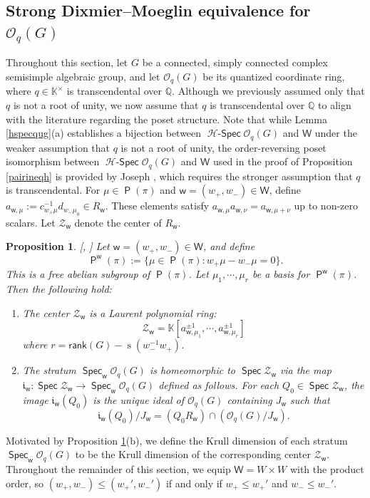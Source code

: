 \documentclass[11pt]{article}
\newtheorem{prop}[equation]{Proposition}
\theoremstyle{definition}
\numberwithin{equation}{section}
\newcommand{\QQ}{\mathbb{Q}}
\newcommand{\KK}{\mathbb{K}}
\newcommand{\qu}{\mathcal{O}}
\newcommand{\cZ}{\mathcal{Z}}
\newcommand{\Hf}{\mathcal{H}} %
\newcommand\rank{\mathsf{rank}}
\DeclareMathOperator{\si}{\mathrm{s}}
\DeclareMathOperator{\pois}{\mathsf{P}}
\newcommand\ii{\mathfrak{i}}
\newcommand\W{\mathsf{W}}
\newcommand\w{\mathsf{w}}
\DeclareMathOperator{\spec}{\mathsf{Spec}}
\DeclareMathOperator{\hspec}{\Hf-\mathsf{Spec}}
\begin{document}
	\subsection{Strong Dixmier--Moeglin equivalence for $\qu_q(G)$}\label{spdmeOqG}
 Throughout this section, let $G$ be a connected, simply connected complex semisimple algebraic group, and let $\qu_q(G)$ be its quantized coordinate ring, where $q \in \KK^{\times}$ is transcendental over $\QQ$. Although we previously assumed only that $q$ is not a root of unity, we now assume that $q$ is transcendental over $\QQ$ to align with the literature regarding the poset structure. Note that while Lemma \ref{hspecqug}(a) establishes a bijection between $\hspec\qu_q(G)$ and $\W$ under the weaker assumption that $q$ is not a root of unity, the order-reversing poset isomorphism between $\hspec\qu_q(G)$ and $\W$ used in the proof of Proposition \ref{pairineqh} is provided by Joseph \cite{JO95}, which requires the stronger assumption that $q$ is transcendental.  For $\mu\in\pois(\pi)$ and $\w= (w_+,w_-)\in\W$, define $a_{\w,\mu}:= c_{w_+\mu}^{-1}d_{w_-\mu_0}\in R_{\w}$. These elements satisfy $a_{\w,\mu}a_{\w,\nu}= a_{\w,\mu+ \nu}$ up to non-zero scalars. Let $\cZ_{\w}$ denote the center of $R_{\w}$. 


 \begin{prop}\label{centstrat}[\cite[Theorem II.4.14]{BG02}, \cite[Theorems 3.1 and 2.3(ii)]{YA14}]
 	Let $\w= (w_+,w_-)\in\W$, and define 
 	$$\pois^{\w}(\pi):= \{\mu\in\pois(\pi): w_+\mu- w_-\mu=0\}.$$
 	 This is a free abelian subgroup of $\pois(\pi)$. Let $\mu_1,\cdots,\mu_r$ be a basis for  $\pois^{\w}(\pi)$. Then the following hold:
 	   \begin{enumerate}
 		\item[(a)] The center $\cZ_{\w}$ is a Laurent polynomial ring:
 		$$\cZ_{\w}= \KK[a_{\w,\mu_1}^{\pm1},\cdots,a_{\w,\mu_r}^{\pm1}]$$
 		where $r= \rank(G)- \si(w_-^{-1}w_+)$. 
 		\item[(b)] The stratum $\spec_{\w}\qu_q(G)$  is homeomorphic to $\spec\cZ_{\w}$ via the map $\ii_{\w}: \spec\cZ_{\w}\to\spec_{\w}\qu_q(G)$ defined as follows. For each $Q_0\in\spec \cZ_{\w}$, the image $\ii_{\w}(Q_0)$ is the unique ideal of $\qu_q(G)$ containing $J_{\w}$ such that
 		$$\ii_{\w}(Q_0)/J_{\w}= (Q_0R_{\w})\cap(\qu_q(G)/J_{\w}).$$
 	\end{enumerate}
 \end{prop}

 
Motivated by Proposition \ref{centstrat}(b), we define the Krull dimension of each stratum $\spec_{\w}\qu_q(G)$ to be the Krull dimension of the corresponding center $\cZ_{\w}$. Throughout the remainder of this section, we equip $\W= W\times W$ with the product order, so  $(w_{+},w_-) \le (w_+',w_{-}')$  if and only if $ w_+ \le w_+'$ and $w_- \le w_-'$.
 
\end{document}
